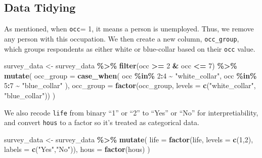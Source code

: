 \documentclass[
]{article}
\newenvironment{Shaded}{\begin{snugshade}}{\end{snugshade}}
\newcommand{\AttributeTok}[1]{\textcolor[rgb]{0.13,0.29,0.53}{#1}}
\newcommand{\DecValTok}[1]{\textcolor[rgb]{0.00,0.00,0.81}{#1}}
\newcommand{\FunctionTok}[1]{\textcolor[rgb]{0.13,0.29,0.53}{\textbf{#1}}}
\newcommand{\NormalTok}[1]{#1}
\newcommand{\OtherTok}[1]{\textcolor[rgb]{0.56,0.35,0.01}{#1}}
\newcommand{\SpecialCharTok}[1]{\textcolor[rgb]{0.81,0.36,0.00}{\textbf{#1}}}
\newcommand{\StringTok}[1]{\textcolor[rgb]{0.31,0.60,0.02}{#1}}
\begin{document}
\subsection{Data Tidying}\label{data-tidying}

As mentioned, when \texttt{occ}= 1, it means a person is unemployed.
Thus, we remove any person with this occupation. We then create a new
column, \texttt{occ\_group}, which groups respondents as either white or
blue-collar based on their \texttt{occ} value.

\begin{Shaded}
\begin{Highlighting}[]
\NormalTok{survey\_data }\OtherTok{\textless{}{-}}\NormalTok{ survey\_data }\SpecialCharTok{\%\textgreater{}\%}
  \FunctionTok{filter}\NormalTok{(occ }\SpecialCharTok{\textgreater{}=} \DecValTok{2} \SpecialCharTok{\&}\NormalTok{ occ }\SpecialCharTok{\textless{}=} \DecValTok{7}\NormalTok{) }\SpecialCharTok{\%\textgreater{}\%}
  \FunctionTok{mutate}\NormalTok{(}
    \AttributeTok{occ\_group =} \FunctionTok{case\_when}\NormalTok{(}
\NormalTok{      occ }\SpecialCharTok{\%in\%} \DecValTok{2}\SpecialCharTok{:}\DecValTok{4} \SpecialCharTok{\textasciitilde{}} \StringTok{"white\_collar"}\NormalTok{,}
\NormalTok{      occ }\SpecialCharTok{\%in\%} \DecValTok{5}\SpecialCharTok{:}\DecValTok{7} \SpecialCharTok{\textasciitilde{}} \StringTok{"blue\_collar"}
\NormalTok{    ),}
    \AttributeTok{occ\_group =} \FunctionTok{factor}\NormalTok{(occ\_group, }\AttributeTok{levels =} \FunctionTok{c}\NormalTok{(}\StringTok{"white\_collar"}\NormalTok{, }\StringTok{"blue\_collar"}\NormalTok{))}
\NormalTok{  )}
\end{Highlighting}
\end{Shaded}

We also recode \texttt{life} from binary ``1'' or ``2'' to ``Yes'' or
``No'' for interpretiability, and convert \texttt{hous} to a factor so
it's treated as categorical data.

\begin{Shaded}
\begin{Highlighting}[]
\NormalTok{survey\_data }\OtherTok{\textless{}{-}}\NormalTok{ survey\_data }\SpecialCharTok{\%\textgreater{}\%}
  \FunctionTok{mutate}\NormalTok{(}
    \AttributeTok{life =} \FunctionTok{factor}\NormalTok{(life, }\AttributeTok{levels =} \FunctionTok{c}\NormalTok{(}\DecValTok{1}\NormalTok{,}\DecValTok{2}\NormalTok{), }\AttributeTok{labels =} \FunctionTok{c}\NormalTok{(}\StringTok{"Yes"}\NormalTok{,}\StringTok{"No"}\NormalTok{)),}
    \AttributeTok{hous =} \FunctionTok{factor}\NormalTok{(hous)  }
\NormalTok{  )}
\end{Highlighting}
\end{Shaded}
\end{document}
